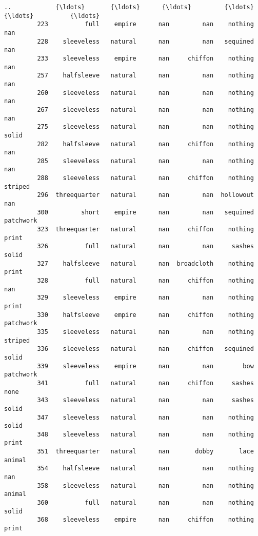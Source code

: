 \documentclass[11pt]{article}
\begin{document}
\begin{Verbatim}[commandchars=\\\{\}]
         ..            {\ldots}       {\ldots}      {\ldots}         {\ldots}        {\ldots}          {\ldots}   
         223          full    empire      nan         nan    nothing          nan   
         228    sleeveless   natural      nan         nan   sequined          nan   
         233    sleeveless    empire      nan     chiffon    nothing          nan   
         257    halfsleeve   natural      nan         nan    nothing          nan   
         260    sleeveless   natural      nan         nan    nothing          nan   
         267    sleeveless   natural      nan         nan    nothing          nan   
         275    sleeveless   natural      nan         nan    nothing        solid   
         282    halfsleeve   natural      nan     chiffon    nothing          nan   
         285    sleeveless   natural      nan         nan    nothing          nan   
         288    sleeveless   natural      nan     chiffon    nothing      striped   
         296  threequarter   natural      nan         nan  hollowout          nan   
         300         short    empire      nan         nan   sequined    patchwork   
         323  threequarter   natural      nan     chiffon    nothing        print   
         326          full   natural      nan         nan     sashes        solid   
         327    halfsleeve   natural      nan  broadcloth    nothing        print   
         328          full   natural      nan     chiffon    nothing          nan   
         329    sleeveless    empire      nan         nan    nothing        print   
         330    halfsleeve    empire      nan     chiffon    nothing    patchwork   
         335    sleeveless   natural      nan         nan    nothing      striped   
         336    sleeveless   natural      nan     chiffon   sequined        solid   
         339    sleeveless    empire      nan         nan        bow    patchwork   
         341          full   natural      nan     chiffon     sashes         none   
         343    sleeveless   natural      nan         nan     sashes        solid   
         347    sleeveless   natural      nan         nan    nothing        solid   
         348    sleeveless   natural      nan         nan    nothing        print   
         351  threequarter   natural      nan       dobby       lace       animal   
         354    halfsleeve   natural      nan         nan    nothing          nan   
         358    sleeveless   natural      nan         nan    nothing       animal   
         360          full   natural      nan         nan    nothing        solid   
         368    sleeveless    empire      nan     chiffon    nothing        print   
         

\end{Verbatim}
\end{document}
